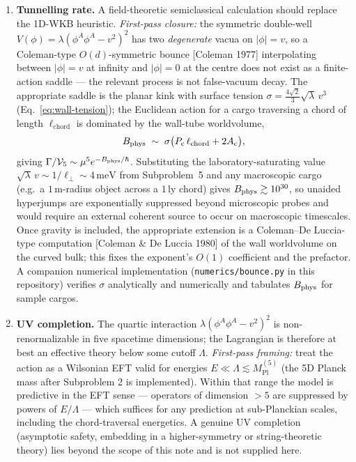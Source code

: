 \documentclass[11pt,a4paper]{article}
\begin{document}
\begin{enumerate}[leftmargin=*]
\item \textbf{Tunnelling rate.} A field-theoretic semiclassical calculation should replace the 1D-WKB heuristic. \emph{First-pass closure:} the symmetric double-well $V(\phi)=\lambda(\phi^A\phi^A-v^2)^2$ has two \emph{degenerate} vacua on $|\phi|=v$, so a Coleman-type $O(d)$-symmetric bounce [Coleman 1977] interpolating between $|\phi|=v$ at infinity and $|\phi|=0$ at the centre does not exist as a finite-action saddle --- the relevant process is not false-vacuum decay. The appropriate saddle is the planar kink with surface tension $\sigma=\tfrac{4\sqrt 2}{3}\sqrt\lambda\,v^3$ (Eq.~\ref{eq:wall-tension}); the Euclidean action for a cargo traversing a chord of length $\ell_{\mathrm{chord}}$ is dominated by the wall-tube worldvolume,
\begin{equation*}
B_{\rm phys} \;\sim\; \sigma\bigl(P_{\rm c}\,\ell_{\mathrm{chord}} + 2A_{\rm c}\bigr),
\end{equation*}
giving $\Gamma/\mathcal{V}_5\sim\mu^5 e^{-B_{\rm phys}/\hbar}$. Substituting the laboratory-saturating value $\sqrt{\lambda}\,v\sim 1/\ell_\perp\sim 4\,\mathrm{meV}$ from Subproblem~5 and any macroscopic cargo (e.g.\ a $1\,\mathrm{m}$-radius object across a $1\,\mathrm{ly}$ chord) gives $B_{\rm phys}\gtrsim10^{30}$, so unaided hyperjumps are exponentially suppressed beyond microscopic probes and would require an external coherent source to occur on macroscopic timescales. Once gravity is included, the appropriate extension is a Coleman--De Luccia-type computation [Coleman \& De Luccia 1980] of the wall worldvolume on the curved bulk; this fixes the exponent's $O(1)$ coefficient and the prefactor. A companion numerical implementation (\texttt{numerics/bounce.py} in this repository) verifies $\sigma$ analytically and numerically and tabulates $B_{\rm phys}$ for sample cargos.

\item \textbf{UV completion.} The quartic interaction $\lambda(\phi^A\phi^A-v^2)^2$ is non-renormalizable in five spacetime dimensions; the Lagrangian is therefore at best an effective theory below some cutoff $\Lambda$. \emph{First-pass framing:} treat the action as a Wilsonian EFT valid for energies $E\ll\Lambda\lesssim M_{\text{Pl}}^{(5)}$ (the 5D Planck mass after Subproblem 2 is implemented). Within that range the model is predictive in the EFT sense --- operators of dimension $>5$ are suppressed by powers of $E/\Lambda$ --- which suffices for any prediction at sub-Planckian scales, including the chord-traversal energetics. A genuine UV completion (asymptotic safety, embedding in a higher-symmetry or string-theoretic theory) lies beyond the scope of this note and is not supplied here.
\end{enumerate}
\end{document}
